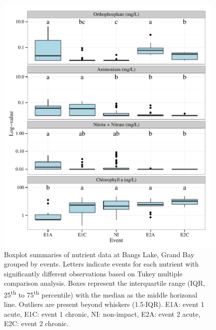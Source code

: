\documentclass[letterpaper,12pt]{article}\usepackage[]{graphicx}\usepackage[]{color}
\makeatletter
\def\maxwidth{ %
  \ifdim\Gin@nat@width>\linewidth
    \linewidth
  \else
    \Gin@nat@width
  \fi
}
\newenvironment{kframe}{%
 \def\at@end@of@kframe{}%
 \ifinner\ifhmode%
  \def\at@end@of@kframe{\end{minipage}}%
  \begin{minipage}{\columnwidth}%
 \fi\fi%
 \def\FrameCommand##1{\hskip\@totalleftmargin \hskip-\fboxsep
 \colorbox{shadecolor}{##1}\hskip-\fboxsep
     \hskip-\linewidth \hskip-\@totalleftmargin \hskip\columnwidth}%
 \MakeFramed {\advance\hsize-\width
   \@totalleftmargin\z@ \linewidth\hsize
   \@setminipage}}%
 {\par\unskip\endMakeFramed%
 \at@end@of@kframe}
\makeatother
\begin{document}
\begin{landscape}
\centering\vspace*{\fill}
\begin{kframe}


{\ttfamily\noindent\bfseries{}}

{\ttfamily\noindent\bfseries\color{errorcolor}{\#\# Error in is.data.frame(y): object 'met\_proc' not found}}

{\ttfamily\noindent\bfseries\color{errorcolor}{\#\# Error in ggplot(toplo, aes(x = date, y = value)): object 'toplo' not found}}

{\ttfamily\noindent\bfseries\color{errorcolor}{\#\# Error in eval(expr, envir, enclos): object 'p' not found}}\end{kframe}
\end{landscape}
\clearpage

\begin{figure}[!ht]

{\centering \includegraphics[width=\maxwidth]{figs/tukey-1} 

}

\caption[Boxplot summaries of nutrient data at Bangs Lake, Grand Bay grouped by events]{Boxplot summaries of nutrient data at Bangs Lake, Grand Bay grouped by events.  Letters indicate events for each nutrient with significantly different observations based on Tukey multiple comparison analysis.  Boxes represent the interquartile range (IQR, 25\textsuperscript{th} to 75\textsuperscript{th} percentile) with the median as the middle horizonal line.  Outliers are present beyond whiskers (1.5$\cdot$IQR). E1A: event 1 acute, E1C: event 1 chronic, NI: non-impact, E2A: event 2 acute, E2C: event 2 chronic.}\label{fig:tukey}
\end{figure}
\end{document}
